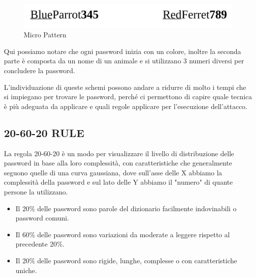 \begin{itemize}
          \begin{figure}[h]
              \centering
              \includegraphics[width=\linewidth]{Immagini/introduzione/Micro_Pattern.png}
              \caption{Micro Pattern}
              \label{fig:micro}
          \end{figure}
          \newline Qui possiamo notare che ogni password inizia con un colore, inoltre la seconda parte è composta da un nome di un animale e si utilizzano 3 numeri diversi per concludere la password.
\end{itemize}

L'individuazione di queste schemi possono andare a ridurre di molto i tempi che si impiegano per trovare le password, perché ci permettono di capire quale tecnica è più adeguata da applicare e quali regole applicare per l’esecuzione dell’attacco.

\subsection{20-60-20 RULE}

La regola 20-60-20 è un modo per visualizzare il livello di distribuzione delle password in base alla loro complessità, con caratteristiche che generalmente seguono quelle di una curva gaussiana, dove sull'asse delle X abbiamo la complessità della password e sul lato delle Y abbiamo il "numero" di quante persone la utilizzano.
\begin{itemize}
    \item Il 20\% delle password sono parole del dizionario facilmente indovinabili o password comuni.
    \item Il 60\% delle password sono variazioni da moderate a leggere rispetto al precedente 20\%.
    \item Il 20\% delle password sono rigide, lunghe, complesse o con caratteristiche uniche.
\end{itemize}

\newpage

